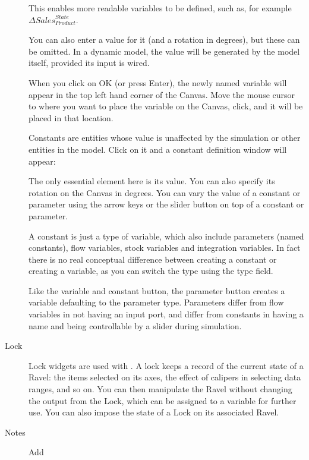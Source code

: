 \begin{description}
\begin{itemize}
\end{itemize}

This enables more readable variables to be defined, such as, for example $\Delta{Sales}_{Product}^{State}$.

You can also enter a value for it (and a rotation in degrees), but these can be omitted. In a dynamic model, the value will be generated by the model itself, provided its input is wired.


When you click on OK (or press Enter), the newly named variable will appear in the top left hand corner of the Canvas. Move the mouse cursor to where you want to place the variable on the Canvas, click, and it will be placed in that location.


Constants are entities whose value is unaffected by the simulation or other entities in the model. Click on it and a constant definition window will appear:

\begin{center}
\end{center}

The only essential element here is its value. You can also specify its rotation on the Canvas in degrees. You can vary the value of a constant or parameter using the arrow keys or the slider button on top of a constant or parameter.

A constant is just a type of variable, which also include parameters (named constants), flow variables, stock variables and integration variables. In fact there is no real conceptual difference between creating a constant or creating a variable, as you can switch the type using the type field.

Like the variable and constant button, the parameter button creates a variable defaulting to the parameter type. Parameters differ from flow variables in not having an input port, and differ from constants in having a name and being controllable by a slider during simulation.

\item[Lock] Lock widgets  are used with . A lock keeps a record of the current state of a Ravel: the items selected on its axes, the effect of calipers in selecting data ranges, and so on. You can then manipulate the Ravel without changing the output from the Lock, which can be assigned to a variable for further use. You can also impose the state of a Lock on its associated Ravel.

\item[Notes] Add 


\end{description}
